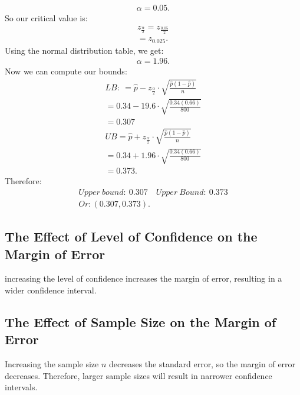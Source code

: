 \documentclass{report}
\begin{document}
\begin{mdframed}
\begin{align*}
            \alpha = 0.05
        .\end{align*}
        \bigbreak \noindent 
        So our critical value is:
        \begin{align*}
            z_{\frac{\alpha}{2}} = z_{\frac{0.05}{2}} \\
            = z_{0.025}
        .\end{align*}
        Using the normal distribution table, we get:
        \begin{align*}
            \alpha = 1.96
        .\end{align*}
        \bigbreak \noindent 
        Now we can compute our bounds:
        \begin{align*}
            LB:\ = \hat{p} - z_{\frac{\alpha}{2}} \cdot \sqrt{\frac{\hat{p}(1-\hat{p})}{n}} \\
            = 0.34 - 19.6 \cdot \sqrt{\frac{0.34(0.66)}{800}} \\
            = 0.307 \\
            UB = \hat{p} + z_{\frac{\alpha}{2}} \cdot \sqrt{\frac{\hat{p}(1-\hat{p})}{n}} \\
            =0.34 + 1.96 \cdot \sqrt{\frac{0.34(0.66)}{800}} \\
            = 0.373
        .\end{align*}
        \bigbreak \noindent 
        Therefore:
        \begin{align*}
            Upper\ bound:\ 0.307 \quad Upper\ Bound:\ 0.373 \\
            Or: (0.307,0.373)
        .\end{align*}
    \end{mdframed}


    \bigbreak \noindent \bigbreak \noindent 
    \subsection*{The Effect of Level of Confidence on the Margin of Error}
    \bigbreak \noindent 
    increasing the level of confidence increases the margin of error, resulting in a wider confidence interval.

    \bigbreak \noindent \bigbreak \noindent 
    \subsection*{The Effect of Sample Size on the Margin of Error}
    \bigbreak \noindent 
    Increasing the sample size $n $ decreases the standard error, so the margin of error decreases. Therefore, larger sample sizes will result in narrower confidence intervals.
\end{document}
